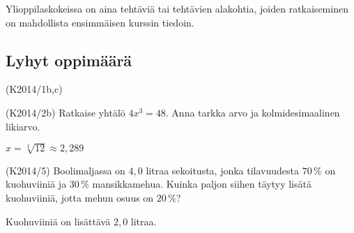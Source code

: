 Ylioppilaskokeissa on aina tehtäviä tai tehtävien alakohtia, joiden ratkaiseminen on mahdollista ensimmäisen kurssin tiedoin.


\subsection*{Lyhyt oppimäärä}
\begin{multicols}{2}
\begin{tehtava} (K2014/1b,c) 
    \begin{vastaus}
    \end{vastaus}	
\end{tehtava}

\begin{tehtava}(K2014/2b)
Ratkaise yhtälö $4x^3=48$. Anna tarkka arvo ja kolmidesimaalinen likiarvo.
    \begin{vastaus}

$x=\sqrt[3]{12}\approx2,289$

    \end{vastaus}	
\end{tehtava}

\begin{tehtava} (K2014/5) Boolimaljassa on $4,0$ litraa sekoitusta, jonka tilavuudesta $70\,\%$ on kuohuviiniä ja $30\,\%$ mansikkamehua. Kuinka paljon siihen täytyy lisätä kuohuviiniä, jotta mehun osuus on $20\,\%$?
    \begin{vastaus}
	    Kuohuviiniä on lisättävä $2,0$ litraa.
    \end{vastaus}
\end{tehtava}



\end{multicols}
